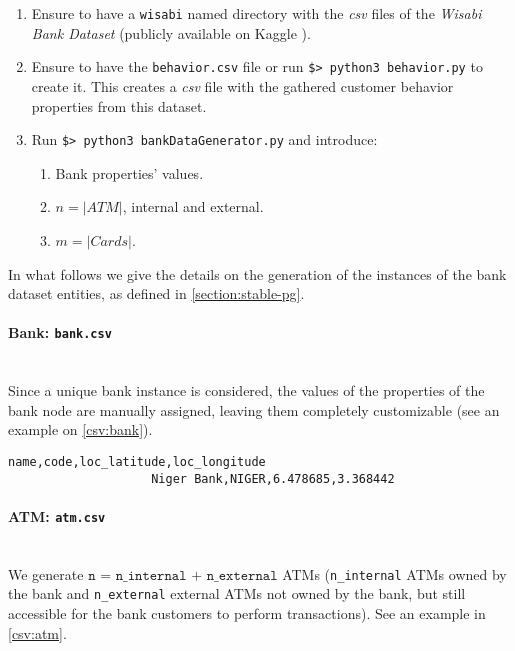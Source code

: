 \begin{enumerate}
    \item Ensure to have a \texttt{wisabi} named directory with the \emph{csv} files of the \emph{Wisabi Bank Dataset} (publicly available on Kaggle \cite{wisabi-bank-dataset}).
    \item Ensure to have the \texttt{behavior.csv} file or run \texttt{\$> python3 behavior.py} to create it. This creates a \emph{csv} file with the gathered customer behavior properties from this dataset.
    \item Run \texttt{\$> python3 bankDataGenerator.py} and introduce:
    \begin{enumerate}
        \item Bank properties' values.
        \item $n = |ATM|$, internal and external.
        \item $m = |Cards|$.
    \end{enumerate}
\end{enumerate}

In what follows we give the details on the generation of the instances of the bank dataset entities, as defined in \ref{section:stable-pg}.

\paragraph{Bank: \texttt{bank.csv}\\\\}
\noindent
Since a unique bank instance is considered, the values of the properties of the bank node are manually assigned, 
leaving them completely customizable (see an example on \ref{csv:bank}).

\begin{center}
\lstset{style=csvStyle}
\begin{lstlisting}[caption={Example of a bank.csv}, label={csv:bank}]
                    name,code,loc_latitude,loc_longitude
                    Niger Bank,NIGER,6.478685,3.368442
\end{lstlisting}
\end{center}

\paragraph{ATM: \texttt{atm.csv}\\\\}

\noindent
We generate $\texttt{n = n\_internal + n\_external}$ ATMs (\texttt{n\_internal} ATMs owned by the bank and \texttt{n\_external} external ATMs not owned by the bank, but still accessible
for the bank customers to perform transactions). See an example in \ref{csv:atm}.

